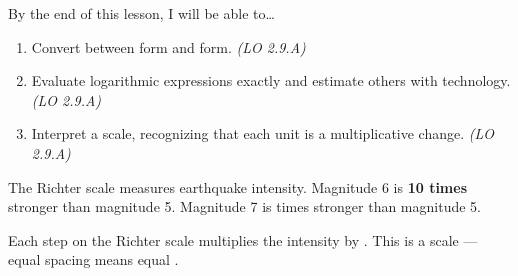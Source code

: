 \documentclass[10pt]{article}
\begin{document}
\namedateperiod

\vspace{0.04in}

\begin{objectivebox}
By the end of this lesson, I will be able to\ldots
\begin{enumerate}[itemsep=2pt]
  \item Convert between  form and  form. \hfill\textit{(LO 2.9.A)}
  \item Evaluate logarithmic expressions exactly and estimate others with technology. \hfill\textit{(LO 2.9.A)}
  \item Interpret a  scale, recognizing that each unit is a multiplicative change. \hfill\textit{(LO 2.9.A)}
\end{enumerate}
\end{objectivebox}

\vspace{0.04in}

\begin{vocabbox}
\end{vocabbox}

\vspace{0.04in}

\begin{hookbox}
The Richter scale measures earthquake intensity. Magnitude 6 is \textbf{10 times} stronger
than magnitude 5. Magnitude 7 is  times stronger than magnitude 5.

Each step on the Richter scale multiplies the intensity by .
This is a  scale --- equal spacing means equal .
\end{hookbox}

\vspace{0.04in}
\end{document}
